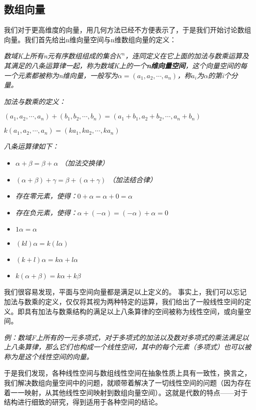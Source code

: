 \documentclass[a4paper]{ctexart}
\begin{document}
\subsection{数组向量}
我们对于更高维度的向量，用几何方法已经不方便表示了，于是我们开始讨论数组向量。我们首先给出n维向量空间与n维数组向量的定义：

\textit{数域K上所有n元有序数组组成的集合$K^n$，连同定义在它上面的加法与数乘运算及其满足的八条运算律一起，称为数域K上的一个\textbf{n维向量空间}，这个向量空间的每一个元素都被称为n维向量，一般写为$\alpha =(a_1,a_2,\cdots,a_n)$，称$a_i$为$\alpha$的第i个分量。}

\textit{加法与数乘的定义：}

\textit{$(a_1,a_2,\cdots,a_n)+(b_1,b_2,\cdots,b_n)=(a_1+b_1,a_2+b_2,\cdots,a_n+b_n)$}

\textit{$k(a_1,a_2,\cdots,a_n)=(ka_1,ka_2,\cdots,ka_n)$}

\textit{八条运算律如下：}

\begin{itemize}
\item \textit{$\alpha+\beta=\beta+\alpha$ （加法交换律）}
\item \textit{$(\alpha+\beta)+\gamma=\beta+(\alpha+\gamma)$ （加法结合律）}
\item \textit{存在零元素，使得：$0+\alpha=\alpha+0=\alpha$}
\item \textit{存在负元素，使得：$\alpha + (-\alpha)=(-\alpha)+\alpha=0$}
\item \textit{$1\alpha=\alpha$}
\item \textit{$(kl)\alpha=k(l\alpha)$}
\item \textit{$(k+l)\alpha=k\alpha+l\alpha$}
\item \textit{$k(\alpha +\beta)=k\alpha +k\beta$}
\end{itemize}

我们很容易发现，平面与空间向量都是满足以上定义的。
事实上，我们可以忘记加法与数乘的定义，仅仅将其视为两种特定的运算，我们给出了一般线性空间的定义。即具有加法与数乘结构的满足以上八条算律的空间被称为线性空间，或向量空间。

\textit{例：数域F上所有的一元多项式，对于多项式的加法以及数对多项式的乘法满足以上八条算律，那么它们也构成一个线性空间，其中的每个元素（多项式）也可以被称为是这个线性空间的向量。}

于是我们发现，各种线性空间与数组线性空间在抽象性质上具有一致性，换言之，我们解决数组向量空间中的问题，就顺带着解决了一切线性空间的问题（因为存在着一一映射，从其他线性空间映射到数组向量空间）。这就是代数的特点——对于结构进行细致的研究，得到适用于各种空间的结论。
\end{document}
